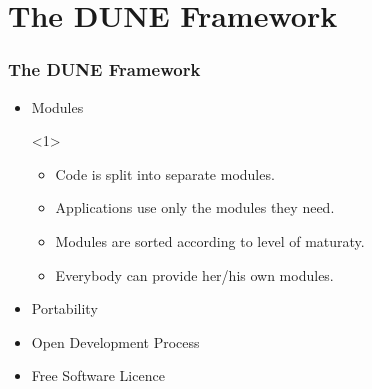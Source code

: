 \documentclass[aspectratio=169,11pt]{beamer}
\theoremstyle{definition}
\begin{document}
\section{The DUNE Framework}

\begin{frame} \frametitle{The DUNE Framework}
  \label{dunedevelopment}
  \hspace*{-.7cm}
    \begin{minipage}[t]{0.54\textwidth}
        \begin{itemize}
        \item Modules
          \begin{onlyenv}<1>
            \begin{itemize}
            \item Code is split into separate modules.
            \item Applications use only the modules they need.
            \item Modules are sorted according to level of maturaty.
            \item Everybody can provide her/his own modules.
            \end{itemize}
          \end{onlyenv}
        \item Portability
        \item Open Development Process
        \item Free Software Licence

\end{itemize}
\end{minipage}
\end{frame}
\end{document}
